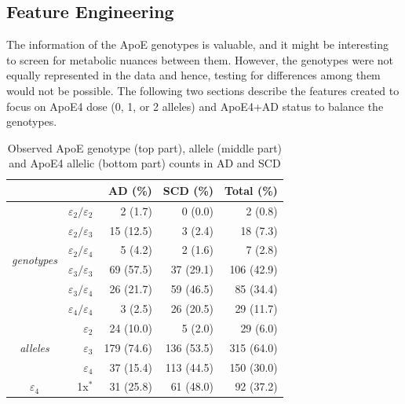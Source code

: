 \documentclass{amsart}
\begin{document}
\subsection{Feature Engineering}\label{featureeng}
The information of the ApoE genotypes is valuable, and it might be interesting to screen for metabolic nuances between them. However, the genotypes were not equally represented in the data and hence, testing for differences among them would not be possible. The following two sections describe the features created to focus on ApoE4 dose (0, 1, or 2 alleles) and ApoE4+AD status to balance the genotypes.

\begin{table}
  \caption{Observed ApoE genotype (top part), allele (middle part) and ApoE4 allelic (bottom part) counts in AD and SCD}
\begin{threeparttable}
\centering 
\label{tab:ApoEfreq}
  \begin{tabular}{crrrr} \toprule
    \multicolumn{1}{l}{}                & \multicolumn{1}{l}{}               & AD (\%)    & SCD (\%)   & Total (\%)  \\ \midrule
    \multirow{6}{*}{\textit{genotypes}} & $\varepsilon_2/\varepsilon_2$        & 2 (1.7)    & 0 (0.0)    & 2 (0.8)     \\
                                        & $\varepsilon_2/\varepsilon_3$      & 15 (12.5)  & 3 (2.4)    & 18 (7.3)    \\
                                        & $\varepsilon_2/\varepsilon_4$      & 5 (4.2)    & 2 (1.6)    & 7 (2.8)     \\
                                        & $\varepsilon_3/\varepsilon_3$      & 69 (57.5)  & 37 (29.1)  & 106 (42.9)  \\
                                        & $\varepsilon_3/\varepsilon_4$      & 26 (21.7)  & 59 (46.5)  & 85 (34.4)   \\
                                        & $\varepsilon_4/\varepsilon_4$      & 3 (2.5)    & 26 (20.5)  & 29 (11.7)   \\ \midrule
   \multirow{3}{*}{\textit{alleles}}    & $\varepsilon_2$    & 24 (10.0)  & 5 (2.0)    & 29 (6.0)    \\
                                        & $\varepsilon_3$    & 179 (74.6) & 136 (53.5) & 315 (64.0)    \\
                                        & $\varepsilon_4$   & 37 (15.4)  & 113 (44.5) & 150 (30.0)    \\ \midrule
    \multirow{4}{*}{$\varepsilon_4$}   & 1x$^\ast$            & 31 (25.8)  & 61 (48.0)  & 92 (37.2)   \\

\end{tabular}
\end{threeparttable}
\end{table}
\end{document}
